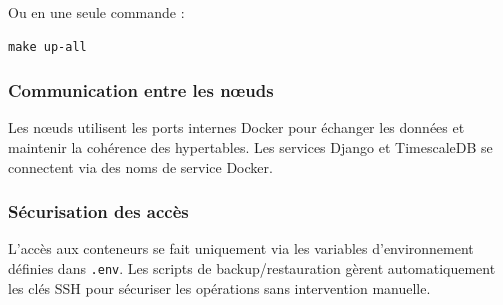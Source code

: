 Ou en une seule commande :
\begin{verbatim}
make up-all
\end{verbatim}

\subsubsection*{Communication entre les nœuds}
Les nœuds utilisent les ports internes Docker pour échanger les données et maintenir la cohérence des hypertables. Les services Django et TimescaleDB se connectent via des noms de service Docker.

\subsubsection*{Sécurisation des accès}
L’accès aux conteneurs se fait uniquement via les variables d’environnement définies dans \texttt{.env}. Les scripts de backup/restauration gèrent automatiquement les clés SSH pour sécuriser les opérations sans intervention manuelle.
